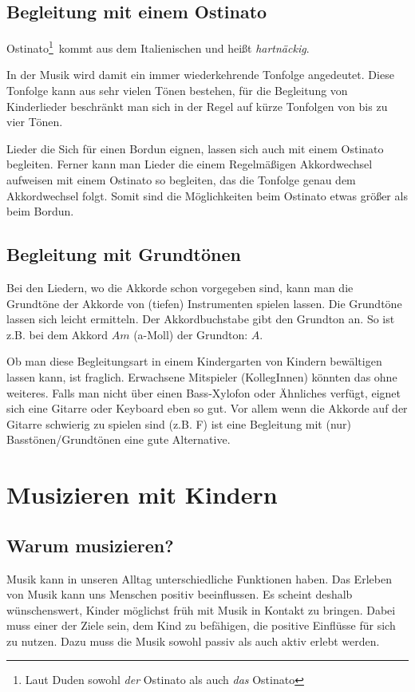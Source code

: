 \documentclass[10pt,a4paper,twoside]{report}
\newcommand{\comment}[1]{
	\marginpar{
		\textsf{#1}
	}
}
\begin{document}
\section{Begleitung mit einem Ostinato}
\glqq Ostinato\footnote{Laut Duden sowohl \emph{der} Ostinato als auch \emph{das} Ostinato}\grqq\ kommt aus dem Italienischen und heißt \emph{hartnäckig}.\comment{ostinato =\\hardnäckig}
In der Musik wird damit ein immer wiederkehrende Tonfolge angedeutet. Diese Tonfolge kann aus sehr vielen
Tönen bestehen, für die Begleitung von Kinderlieder beschränkt man sich in der Regel auf kürze Tonfolgen
von bis zu vier Tönen.

Lieder die Sich für einen Bordun eignen, lassen sich auch mit einem Ostinato begleiten. Ferner kann man
Lieder die einem Regelmäßigen Akkordwechsel aufweisen mit einem Ostinato so begleiten, das die Tonfolge
genau dem Akkordwechsel folgt. Somit sind die Möglichkeiten beim Ostinato etwas größer als beim Bordun.

\section{Begleitung mit Grundtönen}
Bei den Liedern, wo die Akkorde schon vorgegeben sind, kann man die Grundtöne der Akkorde von (tiefen) 
Instrumenten spielen lassen. Die Grundtöne lassen sich leicht ermitteln. Der Akkordbuchstabe gibt den 
Grundton an. So ist z.B. bei dem Akkord $Am$ (a-Moll) der Grundton: $A$.

Ob man diese Begleitungsart in einem Kindergarten von Kindern bewältigen lassen kann, ist fraglich. 
Erwachsene Mitspieler (KollegInnen) könnten das ohne weiteres. Falls man nicht über einen Bass-Xylofon 
oder Ähnliches verfügt,
eignet sich eine Gitarre oder Keyboard eben so gut. Vor allem wenn die Akkorde auf der
Gitarre schwierig zu spielen sind 
(z.B. F) ist eine Begleitung mit (nur) Basstönen/Grundtönen eine gute Alternative.

\chapter{Musizieren mit Kindern}
\section{Warum musizieren?}
Musik kann in unseren Alltag unterschiedliche Funktionen haben. Das Erleben von Musik kann uns 
Menschen positiv beeinflussen. Es scheint deshalb wünschenswert, Kinder möglichst früh mit 
Musik in Kontakt zu bringen. Dabei muss einer der Ziele sein, dem Kind zu befähigen, die positive
Einflüsse für sich zu nutzen. Dazu muss die Musik sowohl passiv als auch aktiv
erlebt werden.
\end{document}
